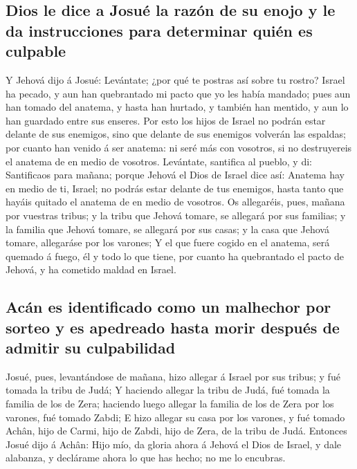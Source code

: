 \hypertarget{dios-le-dice-a-josuuxe9-la-razuxf3n-de-su-enojo-y-le-da-instrucciones-para-determinar-quiuxe9n-es-culpable}{%
\subsection{Dios le dice a Josué la razón de su enojo y le da
instrucciones para determinar quién es
culpable}\label{dios-le-dice-a-josuuxe9-la-razuxf3n-de-su-enojo-y-le-da-instrucciones-para-determinar-quiuxe9n-es-culpable}}

 Y Jehová dijo á Josué: Levántate; ¿por qué te postras
así sobre tu rostro?  Israel ha pecado, y aun han
quebrantado mi pacto que yo les había mandado; pues aun han tomado del
anatema, y hasta han hurtado, y también han mentido, y aun lo han
guardado entre sus enseres.  Por esto los hijos de Israel
no podrán estar delante de sus enemigos, sino que delante de sus
enemigos volverán las espaldas; por cuanto han venido á ser anatema: ni
seré más con vosotros, si no destruyereis el anatema de en medio de
vosotros.  Levántate, santifica al pueblo, y di:
Santificaos para mañana; porque Jehová el Dios de Israel dice así:
Anatema hay en medio de ti, Israel; no podrás estar delante de tus
enemigos, hasta tanto que hayáis quitado el anatema de en medio de
vosotros.  Os allegaréis, pues, mañana por vuestras
tribus; y la tribu que Jehová tomare, se allegará por sus familias; y la
familia que Jehová tomare, se allegará por sus casas; y la casa que
Jehová tomare, allegaráse por los varones;  Y el que
fuere cogido en el anatema, será quemado á fuego, él y todo lo que
tiene, por cuanto ha quebrantado el pacto de Jehová, y ha cometido
maldad en Israel.

\hypertarget{acuxe1n-es-identificado-como-un-malhechor-por-sorteo-y-es-apedreado-hasta-morir-despuuxe9s-de-admitir-su-culpabilidad}{%
\subsection{Acán es identificado como un malhechor por sorteo y es
apedreado hasta morir después de admitir su
culpabilidad}\label{acuxe1n-es-identificado-como-un-malhechor-por-sorteo-y-es-apedreado-hasta-morir-despuuxe9s-de-admitir-su-culpabilidad}}

 Josué, pues, levantándose de mañana, hizo allegar á
Israel por sus tribus; y fué tomada la tribu de Judá;  Y
haciendo allegar la tribu de Judá, fué tomada la familia de los de Zera;
haciendo luego allegar la familia de los de Zera por los varones, fué
tomado Zabdi;  E hizo allegar su casa por los varones, y
fué tomado Achân, hijo de Carmi, hijo de Zabdi, hijo de Zera, de la
tribu de Judá.  Entonces Josué dijo á Achân: Hijo mío, da
gloria ahora á Jehová el Dios de Israel, y dale alabanza, y declárame
ahora lo que has hecho; no me lo encubras.

